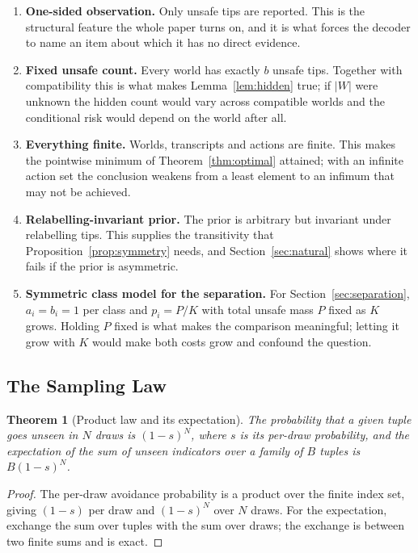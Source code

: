\documentclass[conference]{IEEEtran}
\newtheorem{theorem}{Theorem}
\theoremstyle{definition}
\begin{document}
\begin{enumerate}
\item[1)] \textbf{One-sided observation.} Only unsafe tips are reported. This is the
structural feature the whole paper turns on, and it is what forces the decoder to name an item
about which it has no direct evidence.

\item[2)] \textbf{Fixed unsafe count.} Every world has exactly $b$ unsafe tips. Together with
compatibility this is what makes Lemma~\ref{lem:hidden} true; if $|W|$ were unknown the hidden
count would vary across compatible worlds and the conditional risk would depend on the world
after all.

\item[3)] \textbf{Everything finite.} Worlds, transcripts and actions are finite. This makes
the pointwise minimum of Theorem~\ref{thm:optimal} attained; with an infinite action set the
conclusion weakens from a least element to an infimum that may not be achieved.

\item[4)] \textbf{Relabelling-invariant prior.} The prior is arbitrary but invariant under
relabelling tips. This supplies the transitivity that Proposition~\ref{prop:symmetry} needs,
and Section~\ref{sec:natural} shows where it fails if the prior is asymmetric.

\item[5)] \textbf{Symmetric class model for the separation.} For
Section~\ref{sec:separation}, $a_{i}=b_{i}=1$ per class and $p_{i}=P/K$ with total unsafe mass
$P$ fixed as $K$ grows. Holding $P$ fixed is what makes the comparison meaningful; letting it
grow with $K$ would make both costs grow and confound the question.
\end{enumerate}

\subsection{The Sampling Law}
\label{sec:sampling}

\begin{theorem}[Product law and its expectation]
\label{thm:sampling}
The probability that a given tuple goes unseen in $N$ draws is $(1-s)^{N}$, where $s$ is its
per-draw probability, and the expectation of the sum of unseen indicators over a family of $B$
tuples is $B(1-s)^{N}$.
\end{theorem}

\begin{proof}
The per-draw avoidance probability is a product over the finite index set, giving $(1-s)$ per
draw and $(1-s)^{N}$ over $N$ draws. For the expectation, exchange the sum over tuples with
the sum over draws; the exchange is between two finite sums and is exact.
\end{proof}
\end{document}
